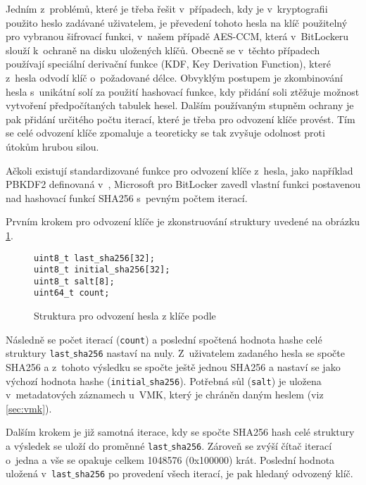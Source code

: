 \label{sec:kdf}

Jedním z~problémů, které je třeba řešit v~případech, kdy je v~kryptografii použito heslo zadávané uživatelem, je převedení tohoto hesla na klíč použitelný pro vybranou šifrovací funkci, v~našem případě AES-CCM, která v~BitLockeru slouží k~ochraně na disku uložených klíčů. Obecně se v~těchto případech používají speciální derivační funkce (KDF, Key Derivation Function), které z~hesla odvodí klíč o~požadované délce. Obvyklým postupem je zkombinování hesla s~unikátní solí za použití hashovací funkce, kdy přidání soli ztěžuje možnost vytvoření předpočítaných tabulek hesel. Dalším používaným stupněm ochrany je pak přidání určitého počtu iterací, které je třeba pro odvození klíče provést. Tím se celé odvození klíče zpomaluje a teoreticky se tak zvyšuje odolnost proti útokům hrubou silou.\cite{Kaliski2000}

Ačkoli existují standardizované funkce pro odvození klíče z~hesla, jako například PBKDF2 definovaná v~\cite{Kaliski2000}, Microsoft pro BitLocker zavedl vlastní funkci postavenou nad hashovací funkcí SHA256 s~pevným počtem iterací.

Prvním krokem pro odvození klíče je zkonstruování struktury uvedené na obrázku \ref{fig:bitlocker-kdf}.

\begin{figure}[h]
		\centering
		\captionsetup{width=0.65\linewidth}
\begin{lstlisting}[frame=none, escapechar=$, basicstyle=\ttfamily\small, columns=fullflexible, keepspaces=true, xleftmargin=.35\textwidth, xrightmargin=.35\textwidth]
uint8_t last_sha256[32];
uint8_t initial_sha256[32];
uint8_t salt[8];
uint64_t count;
\end{lstlisting}
		\caption{Struktura pro odvození hesla z klíče podle \cite{Metz2011}}
		\label{fig:bitlocker-kdf}
\end{figure}

Následně se počet iterací (\texttt{count}) a poslední spočtená hodnota hashe celé struktury \texttt{last$\_$sha256} nastaví na nuly. Z~uživatelem zadaného hesla se spočte SHA256 a z~tohoto výsledku se spočte ještě jednou SHA256 a nastaví se jako výchozí hodnota hashe (\texttt{initial$\_$sha256}). Potřebná sůl (\texttt{salt}) je uložena v~metadatových záznamech u~VMK, který je chráněn daným heslem (viz \ref{sec:vmk}).

Dalším krokem je již samotná iterace, kdy se spočte SHA256 hash celé struktury a výsledek se uloží do proměnné \texttt{last$\_$sha256}. Zároveň se zvýší čítač iterací o~jedna a vše se opakuje celkem 1048576 (0x100000) krát. Poslední hodnota uložená v~\texttt{last$\_$sha256} po provedení všech iterací, je pak hledaný odvozený klíč.\cite{Metz2011,Agostini2019}

